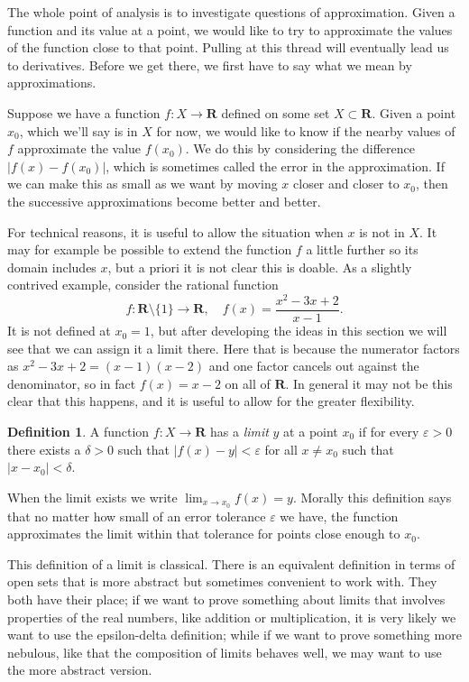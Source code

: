 \documentclass[11pt]{article}
\theoremstyle{definition}
\newtheorem{defi}[theo]{Definition}
\def\eps{\varepsilon}
\def\RR{\mathbf{R}}
\begin{document}
The whole point of analysis is to investigate questions of approximation.
Given a function and its value at a point, we would like to try to approximate
the values of the function close to that point.
Pulling at this thread will eventually lead us to derivatives.
Before we get there, we first have to say what we mean by approximations.

Suppose we have a function $f : X \to \RR$ defined on some set $X \subset \RR$.
Given a point $x_0$, which we'll say is in $X$ for now, we would like to know
if the nearby values of $f$ approximate the value $f(x_0)$.
We do this by considering the difference $|f(x) - f(x_0)|$, which is sometimes
called the error in the approximation.
If we can make this as small as we want by moving $x$ closer and closer to $x_0$,
then the successive approximations become better and better.

For technical reasons, it is useful to allow the situation when $x$ is not in $X$.
It may for example be possible to extend the function $f$ a little further so
its domain includes $x$, but a priori it is not clear this is doable.
As a slightly contrived example, consider the rational function
\[
f : \RR \setminus \{ 1 \} \to \RR,
\quad
f(x) = \frac{x^2 - 3x + 2}{x - 1}.
\]
It is not defined at $x_0 = 1$, but after developing the ideas in this section
we will see that we can assign it a limit there.
Here that is because the numerator factors as $x^2 - 3x + 2 = (x-1)(x-2)$ and
one factor cancels out against the denominator, so in fact $f(x) = x-2$ on all
of $\RR$. In general it may not be this clear that this happens, and it is
useful to allow for the greater flexibility.



\begin{defi}
A function $f : X \to \RR$ has a \emph{limit} $y$ at a point $x_0$ if for every
$\eps > 0$ there exists a $\delta > 0$ such that
\(
|f(x) - y| < \eps
\)
for all $x \not= x_0$ such that $|x - x_0| < \delta$.
\end{defi}

When the limit exists we write $\lim_{x \to x_0} f(x) = y$.
Morally this definition says that no matter how small of an error tolerance
$\eps$ we have, the function approximates the limit within that tolerance for
points close enough to $x_0$.

This definition of a limit is classical.
There is an equivalent definition in terms of open sets that is more abstract
but sometimes convenient to work with.
They both have their place;
if we want to prove something about limits that involves properties of the real
numbers, like addition or multiplication, it is very likely we want to use the
epsilon-delta definition;
while if we want to prove something more nebulous, like that the composition
of limits behaves well, we may want to use the more abstract version.
\end{document}
